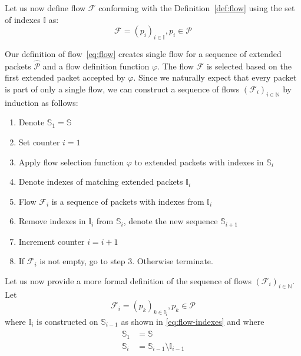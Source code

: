 Let us now define flow $\mathcal{F}$ conforming with the Definition~\ref{def:flow} using the set of indexes $\mathbb{I}$ as:
\begin{equation}\label{eq:flow}
	\mathcal{F} = (p_i)_{i \in \mathbb{I}}, p_i \in \mathcal{P}
\end{equation}

Our definition of flow~\eqref{eq:flow} creates single flow for a sequence of extended packets $\widehat{\mathcal{P}}$ and a flow definition function $\varphi$. The flow $\mathcal{F}$ is selected based on the first extended packet accepted by $\varphi$. Since we naturally expect that every packet is part of only a single flow, we can construct a sequence of flows $(\mathcal{F}_i)_{i \in \mathbb{N}}$ by induction as follows:
\begin{enumerate}[noitemsep]
	\item Denote $\mathbb{S}_1 = \mathbb{S}$
	\item Set counter $i = 1$
	\item Apply flow selection function $\varphi$ to extended packets with indexes in $\mathbb{S}_i$
	\item Denote indexes of matching extended packets $\mathbb{I}_i$
	\item Flow $\mathcal{F}_i $ is a sequence of packets with indexes from $\mathbb{I}_i$
	\item Remove indexes in $\mathbb{I}_i$ from $\mathbb{S}_i$, denote the new sequence $\mathbb{S}_{i+1}$
	\item Increment counter $i = i + 1$
	\item If $\mathcal{F}_i$ is not empty, go to step 3. Otherwise terminate.
\end{enumerate}

Let us now provide a more formal definition of the sequence of flows $(\mathcal{F}_i)_{i \in \mathbb{N}}$. Let
\begin{equation}
	\mathcal{F}_i = (p_k)_{k \in \mathbb{I}_i}, p_k \in \mathcal{P}
\end{equation}
where $\mathbb{I}_{i}$ is constructed on $\mathbb{S}_{i-1}$ as shown in \eqref{eq:flow-indexes} and where\\
\begin{align*}
\begin{split}
	\mathbb{S}_1 &= \mathbb{S} \\
	\mathbb{S}_i &= \mathbb{S}_{i-1} \setminus \mathbb{I}_{i-1}
\end{split}
\end{align*}


